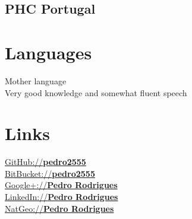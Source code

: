 \documentclass[letterpaper]{deedy-resume} %
\begin{document}
\begin{minipage}[t]{0.33\textwidth}
\subsection{PHC Portugal}

\sectionspace

\section{Languages}
Mother language\\
Very good knowledge and somewhat fluent speech\\

\section{Links}
\href{https://github.com/pedro2555}{GitHub://\textbf{pedro2555}}\\
\href{https://bitbucket.org/pedro2555}{BitBucket://\textbf{pedro2555}}\\
\href{https://plus.google.com/105867523802923906663/posts}{Google+://\textbf{Pedro Rodrigues}}\\
\href{https://www.linkedin.com/in/pedro-rodrigues-452b04ab?trk=hp-identity-name}{LinkedIn://\textbf{Pedro Rodrigues}}\\
\href{http://yourshot.nationalgeographic.com/profile/753830/}{NatGeo://\textbf{Pedro Rodrigues}}\\

\end{minipage}
\hfill
%
%
\end{document}
